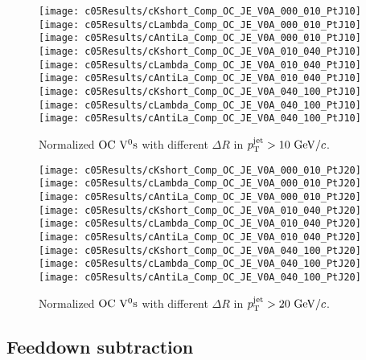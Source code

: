 \begin{figure}[htb]
\begin{center}
\texttt{[image: c05Results/cKshort\_Comp\_OC\_JE\_V0A\_000\_010\_PtJ10]}
\texttt{[image: c05Results/cLambda\_Comp\_OC\_JE\_V0A\_000\_010\_PtJ10]}
\texttt{[image: c05Results/cAntiLa\_Comp\_OC\_JE\_V0A\_000\_010\_PtJ10]}
\texttt{[image: c05Results/cKshort\_Comp\_OC\_JE\_V0A\_010\_040\_PtJ10]}
\texttt{[image: c05Results/cLambda\_Comp\_OC\_JE\_V0A\_010\_040\_PtJ10]}
\texttt{[image: c05Results/cAntiLa\_Comp\_OC\_JE\_V0A\_010\_040\_PtJ10]}
\texttt{[image: c05Results/cKshort\_Comp\_OC\_JE\_V0A\_040\_100\_PtJ10]}
\texttt{[image: c05Results/cLambda\_Comp\_OC\_JE\_V0A\_040\_100\_PtJ10]}
\texttt{[image: c05Results/cAntiLa\_Comp\_OC\_JE\_V0A\_040\_100\_PtJ10]}
\caption{Normalized ${\rm OC}~{\rm V}^{0}{\rm s}$ with different $\Delta R$ in
         $p_{\rm T}^{\rm jet}>10~{\rm GeV}/c$.}
\label{fig:c05RestulsCompOCPtJ10}
\end{center}
\end{figure}

\begin{figure}[htb]
\begin{center}
\texttt{[image: c05Results/cKshort\_Comp\_OC\_JE\_V0A\_000\_010\_PtJ20]}
\texttt{[image: c05Results/cLambda\_Comp\_OC\_JE\_V0A\_000\_010\_PtJ20]}
\texttt{[image: c05Results/cAntiLa\_Comp\_OC\_JE\_V0A\_000\_010\_PtJ20]}
\texttt{[image: c05Results/cKshort\_Comp\_OC\_JE\_V0A\_010\_040\_PtJ20]}
\texttt{[image: c05Results/cLambda\_Comp\_OC\_JE\_V0A\_010\_040\_PtJ20]}
\texttt{[image: c05Results/cAntiLa\_Comp\_OC\_JE\_V0A\_010\_040\_PtJ20]}
\texttt{[image: c05Results/cKshort\_Comp\_OC\_JE\_V0A\_040\_100\_PtJ20]}
\texttt{[image: c05Results/cLambda\_Comp\_OC\_JE\_V0A\_040\_100\_PtJ20]}
\texttt{[image: c05Results/cAntiLa\_Comp\_OC\_JE\_V0A\_040\_100\_PtJ20]}
\caption{Normalized ${\rm OC}~{\rm V}^{0}{\rm s}$ with different $\Delta R$
         in $p_{\rm T}^{\rm jet}>20~{\rm GeV}/c$.}
\label{fig:c05RestulsCompOCPtJ20}
\end{center}
\end{figure}


\subsection{Feeddown subtraction}


